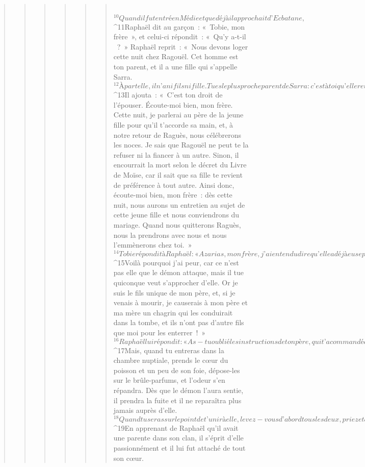 \begin{verse}
\begin{verse}
\begin{verse}
\begin{verse}
\begin{verse}
\begin{verse}
         
${}^{10}Quand il fut entré en Médie et que déjà il approchait d’Ecbatane, 
${}^{11}Raphaël dit au garçon : « Tobie, mon frère », et celui-ci répondit : « Qu’y a-t-il\\ ? » Raphaël reprit : « Nous devons loger cette nuit chez Ragouël. Cet homme est ton parent, et il a une fille qui s’appelle Sarra. 
${}^{12}À part elle, il n’a ni fils ni fille. Tu es le plus proche parent de Sarra : c’est à toi qu’elle revient en priorité et tu as aussi le droit d’hériter de la fortune de son père. D’ailleurs, c’est une jeune fille intelligente, courageuse et très belle, et son père est un homme de bien. » 
${}^{13}Il ajouta : « C’est ton droit de l’épouser. Écoute-moi bien, mon frère. Cette nuit, je parlerai au père de la jeune fille pour qu’il t’accorde sa main, et, à notre retour de Raguès, nous célébrerons les noces. Je sais que Ragouël ne peut te la refuser ni la fiancer à un autre. Sinon, il encourrait la mort selon le décret du Livre de Moïse, car il sait que sa fille te revient de préférence à tout autre. Ainsi donc, écoute-moi bien, mon frère : dès cette nuit, nous aurons un entretien au sujet de cette jeune fille et nous conviendrons du mariage. Quand nous quitterons Raguès, nous la prendrons avec nous et nous l’emmènerons chez toi. »
${}^{14}Tobie répondit à Raphaël : « Azarias, mon frère, j’ai entendu dire qu’elle a déjà eu sept maris et qu’ils sont morts dans leur chambre nuptiale : ils ont succombé la nuit même où ils voulaient s’approcher d’elle. J’ai même entendu dire qu’un démon les tuait. 
${}^{15}Voilà pourquoi j’ai peur, car ce n’est pas elle que le démon attaque, mais il tue quiconque veut s’approcher d’elle. Or je suis le fils unique de mon père, et, si je venais à mourir, je causerais à mon père et ma mère un chagrin qui les conduirait dans la tombe, et ils n’ont pas d’autre fils que moi pour les enterrer ! » 
${}^{16}Raphaël lui répondit : « As-tu oublié les instructions de ton père, qui t’a commandé de prendre femme dans son clan ? Et maintenant, écoute-moi bien, mon frère : ne t’inquiète pas au sujet de ce démon et prends Sarra comme épouse. Car je sais que cette nuit même elle te sera accordée. 
${}^{17}Mais, quand tu entreras dans la chambre nuptiale, prends le cœur du poisson et un peu de son foie, dépose-les sur le brûle-parfums, et l’odeur s’en répandra. Dès que le démon l’aura sentie, il prendra la fuite et il ne reparaîtra plus jamais auprès d’elle. 
${}^{18}Quand tu seras sur le point de t’unir à elle, levez-vous d’abord tous les deux, priez et demandez au Seigneur du ciel de faire venir sur vous sa miséricorde et son salut. N’aie pas peur, car c’est à toi qu’elle a été destinée depuis toujours, et c’est toi qui la sauveras. Elle te suivra, et j’ai bien l’idée que tu auras d’elle des enfants, qui seront pour toi comme des frères. Ne t’inquiète pas. »
${}^{19}En apprenant de Raphaël qu’il avait une parente dans son clan, il s’éprit d’elle passionnément et il lui fut attaché de tout son cœur.
      

\end{verse}
\end{verse}
\end{verse}
\end{verse}
\end{verse}
\end{verse}
